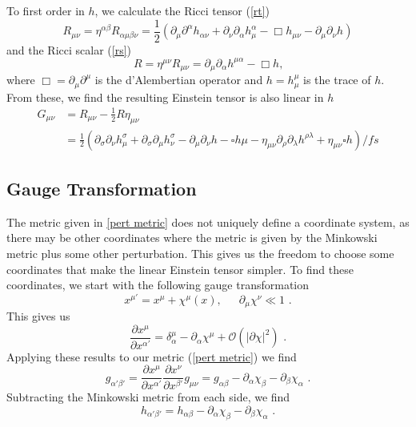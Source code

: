 \documentclass[11pt]{cuthesis}
\newcommand{\mn}{_{\mu\nu}}
\newcommand{\fs}{\text{ .}}
\newcommand{\pd}{\partial}
\begin{document}
To first order in $h$, we calculate the Ricci tensor (\ref{rt})
\begin{equation} \label{lin rt}
R\mn =\eta^{\alpha \beta}R_{\alpha \mu \beta \nu} = \frac{1}{2}\left( \pd_\mu \pd ^\alpha h_{\alpha \nu} + \pd_\nu \pd_\alpha h^\alpha_\mu -\Box h\mn -\pd_\mu \pd_\nu h \right)
\end{equation}
and the Ricci scalar (\ref{rs}) 
\begin{equation} \label{lin rs}
R=\eta^{\mu \nu}R\mn=\pd _\mu \pd_ \alpha h^{\mu \alpha} - \Box h \textbf{,}
\end{equation}
where $\Box=\pd_\mu \pd^\mu $ is the d'Alembertian operator and $h=h^\mu_\mu$ is the trace of $h$. From these, we find the resulting Einstein tensor is also linear in $h$ 
\begin{equation} \label{lin Einstein}
\begin{split}
G\mn & =R\mn -\frac{1}{2} R \eta\mn \\
 & = \frac{1}{2} ( \partial_\sigma \partial_\nu h^\sigma_\mu + \partial_\sigma \partial_\mu h^\sigma_\nu - \partial_\mu \partial_\nu h - \square h\mu -\eta\mn \partial_\rho \partial_\lambda h^{\rho \lambda} + \eta\mn \square h ) /fs
\end{split}
\end{equation}

\subsection{Gauge Transformation}
The metric given in \ref{pert metric} does not uniquely define a coordinate system, as there may be other coordinates where the metric is given by the Minkowski metric plus some other perturbation. This gives us the freedom to choose some coordinates that make the linear Einstein tensor simpler. To find these coordinates, we start with the following gauge transformation
\begin{equation}
x^{\mu'}=x^\mu +\chi ^\mu (x)\text{,} \hspace{20pt}\partial_\mu \chi^\nu \ll 1\fs
\end{equation} 
This gives us
\begin{equation}
\frac{\pd x^\mu}{\pd x^{\alpha'}}=\delta^\mu_\alpha-\pd_\alpha\chi^\mu +\mathcal{O}(|\pd \chi|^2) \fs
\end{equation}  
Applying these results to our metric (\ref{pert metric}) we find
\begin{equation} 
g_{\alpha' \beta'}=\frac{\pd x^\mu}{\pd x^{\alpha'}}\frac{\pd x^\nu}{\pd x^{\beta'}}g\mn=g_{\alpha \beta}-\pd_\alpha \chi_\beta -\pd_\beta \chi_\alpha \fs
\end{equation}
Subtracting the Minkowski metric from each side, we find 
\begin{equation} \label{pert transf}
h_{\alpha' \beta'}=h_{\alpha \beta}-\pd_\alpha\chi_\beta-\pd_\beta\chi_\alpha \fs
\end{equation}
\end{document}
